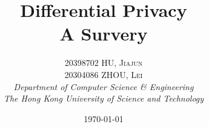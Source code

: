 \documentclass[a4paper, 11pt]{article} %
\begin{document}
\makeatletter
\renewcommand\@biblabel[1]{\textbf{#1.}} %
\renewcommand{\@listI}{\itemsep=0pt} %

\renewcommand{\maketitle}{ %
\begin{flushright} %
{\LARGE\@title} %

\vspace{50pt} %

{\large\@author} %
\\\@date %

\vspace{40pt} %
\end{flushright}
}


\title{\textbf{Differential Privacy}\\ %
A Survery} %

\author{\textsc{20398702 HU, Jiajun \\ 20304086 ZHOU, Lei} %
\\{\textit{Department of Computer Science \& Engineering \\ The Hong Kong University of Science and Technology}}} %

\date{\today} %


\maketitle %

\end{document}
